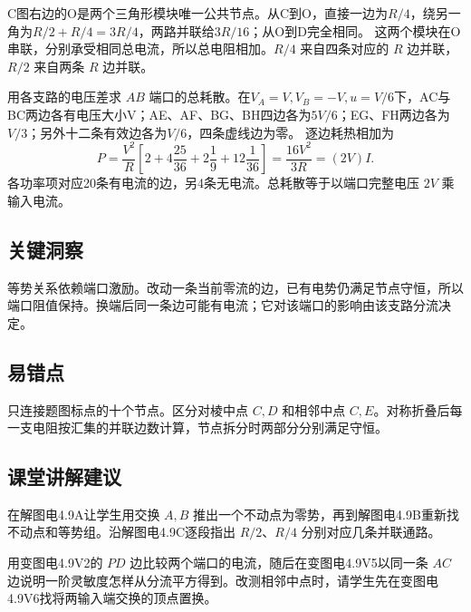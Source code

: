 \documentclass[UTF8,fontset=fandol,a4paper,11pt]{ctexart}
\begin{document}
C图右边的O是两个三角形模块唯一公共节点。从C到O，直接一边为$R/4$，绕另一角为$R/2+R/4=3R/4$，两路并联给$3R/16$；从O到D完全相同。
这两个模块在O串联，分别承受相同总电流，所以总电阻相加。$R/4$ 来自四条对应的 $R$ 边并联，$R/2$ 来自两条 $R$ 边并联。

用各支路的电压差求 $AB$ 端口的总耗散。在$V_A=V,V_B=-V,u=V/6$下，AC与BC两边各有电压大小V；AE、AF、BG、BH四边各为$5V/6$；EG、FH两边各为$V/3$；另外十二条有效边各为$V/6$，四条虚线边为零。
逐边耗热相加为
\[
P=\frac{V^2}{R}\left[2+4\frac{25}{36}+2\frac19+12\frac1{36}\right]
=\frac{16V^2}{3R}=(2V)I.
\]
各功率项对应20条有电流的边，另4条无电流。总耗散等于以端口完整电压 $2V$ 乘输入电流。




\subsection*{关键洞察}

等势关系依赖端口激励。改动一条当前零流的边，已有电势仍满足节点守恒，所以端口阻值保持。换端后同一条边可能有电流；它对该端口的影响由该支路分流决定。



\subsection*{易错点}

只连接题图标点的十个节点。区分对棱中点 $C,D$ 和相邻中点 $C,E$。对称折叠后每一支电阻按汇集的并联边数计算，节点拆分时两部分分别满足守恒。



\subsection*{课堂讲解建议}

在解图电4.9A让学生用交换 $A,B$ 推出一个不动点为零势，再到解图电4.9B重新找不动点和等势组。沿解图电4.9C逐段指出 $R/2$、$R/4$ 分别对应几条并联通路。

用变图电4.9V2的 $PD$ 边比较两个端口的电流，随后在变图电4.9V5以同一条 $AC$ 边说明一阶灵敏度怎样从分流平方得到。改测相邻中点时，请学生先在变图电4.9V6找将两输入端交换的顶点置换。

\end{document}
